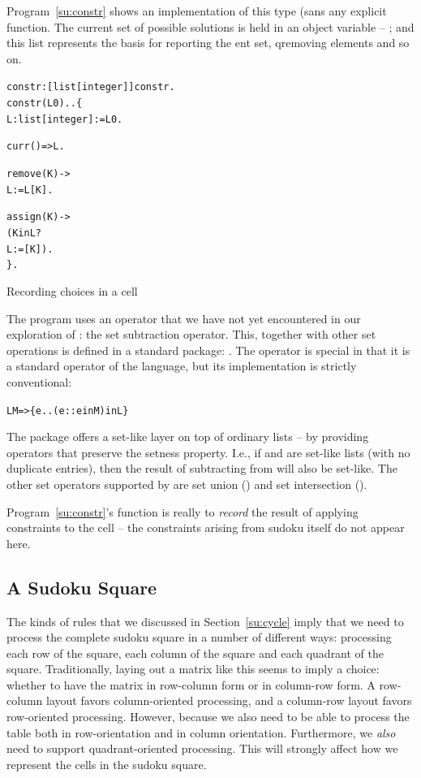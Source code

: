 Program~\vref{su:constr} shows an implementation of this type (sans any explicit  function. The current set of possible solutions is held in an object variable -- ; and this list represents the basis for reporting the ent set, q{remov}ing elements and so on.
\begin{program}
\vspace{0.5ex}
\begin{alltt}
constr:[list[integer]]\sconarrow{}constr.
constr(L0)..\{
  L:list[integer] := L0.

  curr()=>L.

  remove(K) ->
    L := L \bsl{} [K].

  assign(K) ->
    ( K in L ? 
      L := [K]).
\}.
\end{alltt}
\vspace{-2ex}
\caption{Recording choices in a cell}
\label{su:constr}
\end{program}
The  program uses an operator that we have not yet encountered in our exploration of \go: the \q{\bsl{}} set subtraction operator. This, together with other set operations is defined in a standard \go package: . The \q{\bsl{}} operator is special in that it is a standard operator of the \go language, but its implementation is strictly conventional:
\begin{alltt}
L\bsl{}M => \{ e .. (e::\nasf{}e in M) in L \}
\end{alltt}

The  package offers a set-like layer on top of ordinary \go lists -- by providing operators that preserve the setness property. I.e., if  and  are set-like lists (with no duplicate entries), then the result of subtracting  from  will also be set-like. The other set operators supported by  are set union (\q{\union}) and set intersection (\q{\intersection}).

Program~\ref{su:constr}'s function is really to \emph{record} the result of applying constraints to the cell -- the constraints arising from sudoku itself do not appear here.

\subsection{A Sudoku Square}
\label{su:table}

The kinds of rules that we discussed in Section~\vref{su:cycle} imply that we need to process the complete sudoku square in a number of different ways: processing each row of the square, each column of the square and each quadrant of the square. Traditionally, laying out a matrix like this seems to imply a choice: whether to have the matrix in row-column form or in column-row form. A row-column layout favors column-oriented processing, and a column-row layout favors row-oriented processing. However, because we also need to be able to process the table both in row-orientation and in column orientation. Furthermore, we \emph{also} need to support quadrant-oriented processing. This will strongly affect how we represent the cells in the sudoku square.

